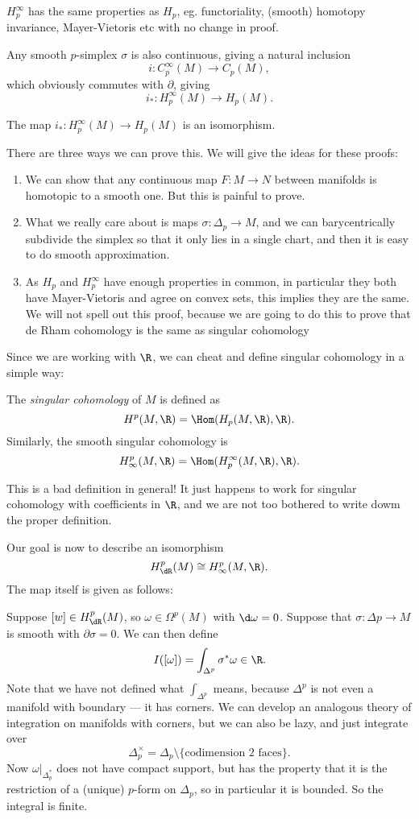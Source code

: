 \documentclass[a4paper]{article}
\begin{document}
$H_p^\infty$ has the same properties as $H_p$, eg. functoriality, (smooth) homotopy invariance, Mayer-Vietoris etc with no change in proof.

Any smooth $p$-simplex $\sigma$ is also continuous, giving a natural inclusion
\[
  i: C_p^\infty(M) \to C_p(M),
\]
which obviously commutes with $\partial$, giving
\[
  i_*: H_p^\infty(M) \to H_p(M).
\]
\begin{thm}
  The map $i_*: H_p^\infty(M) \to H_p(M)$ is an isomorphism.
\end{thm}

There are three ways we can prove this. We will give the ideas for these proofs:
\begin{enumerate}
  \item We can show that any continuous map $F: M \to N$ between manifolds is homotopic to a smooth one. But this is painful to prove.
  \item What we really care about is maps $\sigma: \Delta_p \to M$, and we can barycentrically subdivide the simplex so that it only lies in a single chart, and then it is easy to do smooth approximation.
  \item As $H_p$ and $H_p^\infty$ have enough properties in common, in particular they both have Mayer-Vietoris and agree on convex sets, this implies they are the same. We will not spell out this proof, because we are going to do this to prove that de Rham cohomology is the same as singular cohomology
\end{enumerate}

Since we are working with $\R$, we can cheat and define singular cohomology in a simple way:
\begin{defi}
  The \emph{singular cohomology} of $M$ is defined as
  \[
    H^p(M, \R) = \Hom(H_p(M, \R), \R).
  \]
  Similarly, the smooth singular cohomology is
  \[
    H^p_\infty(M, \R) = \Hom(H_p^\infty(M, \R), \R).
  \]
\end{defi}
This is a bad definition in general! It just happens to work for singular cohomology with coefficients in $\R$, and we are not too bothered to write dowm the proper definition.

Our goal is now to describe an isomorphism
\[
  H^p_{\dR}(M) \cong H^p_\infty(M, \R).
\]
The map itself is given as follows:

Suppose $[w] \in H^p_{\dR}(M)$, so $\omega \in \Omega^p(M)$ with $\d \omega = 0$. Suppose that $\sigma: \Delta p \to M$ is smooth with $\partial \sigma = 0$. We can then define
\[
  I([\omega]) = \int_{\Delta^p} \sigma^* \omega \in \R.
\]
Note that we have not defined what $\int_{\Delta^p}$ means, because $\Delta^p$ is not even a manifold with boundary --- it has corners. We can develop an analogous theory of integration on manifolds with corners, but we can also be lazy, and just integrate over
\[
  \Delta_p^\times = \Delta_p \setminus \{\text{codimension 2 faces}\}.
\]
Now $\omega|_{\Delta_p^*}$ does not have compact support, but has the property that it is the restriction of a (unique) $p$-form on $\Delta_p$, so in particular it is bounded. So the integral is finite.
\end{document}
